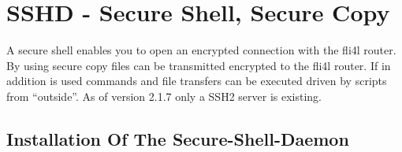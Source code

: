 \section {SSHD - Secure Shell, Secure Copy}

A secure shell enables you to open an encrypted connection with the fli4l router. 
By using secure copy files can be transmitted encrypted to the fli4l router. If 
in addition  is used commands and file 
transfers can be executed driven by scripts from ``outside''. As of version 2.1.7 
only a SSH2 server is existing.

\subsection {Installation Of The Secure-Shell-Daemon}

